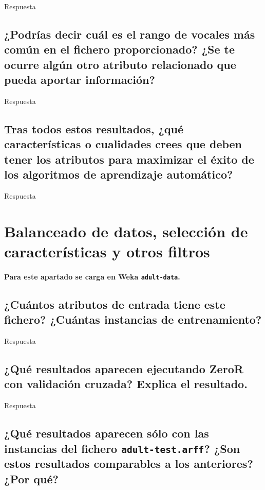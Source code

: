 \documentclass[12pt]{article}
\begin{document}
Respuesta

\subsection*{\small ¿Podrías decir cuál es el rango de vocales más común en el
fichero proporcionado? ¿Se te ocurre algún otro atributo relacionado que pueda
aportar información?}

Respuesta

\subsection*{\small Tras todos estos resultados, ¿qué características o
cualidades crees que deben tener los atributos para maximizar el éxito de los
algoritmos de aprendizaje automático?}

Respuesta

\newpage

\section{Balanceado de datos, selección de características y otros filtros}

\paragraph{\small Para este apartado se carga en Weka \texttt{adult-data}.}

\subsection*{\small ¿Cuántos atributos de entrada tiene este fichero? ¿Cuántas
instancias de entrenamiento?}

Respuesta

\subsection*{\small ¿Qué resultados aparecen ejecutando ZeroR con validación
cruzada? Explica el resultado.}

Respuesta

\subsection*{\small ¿Qué resultados aparecen sólo con las instancias del fichero
\texttt{adult-test.arff}? ¿Son estos resultados comparables a los anteriores?
¿Por qué?}
\end{document}
